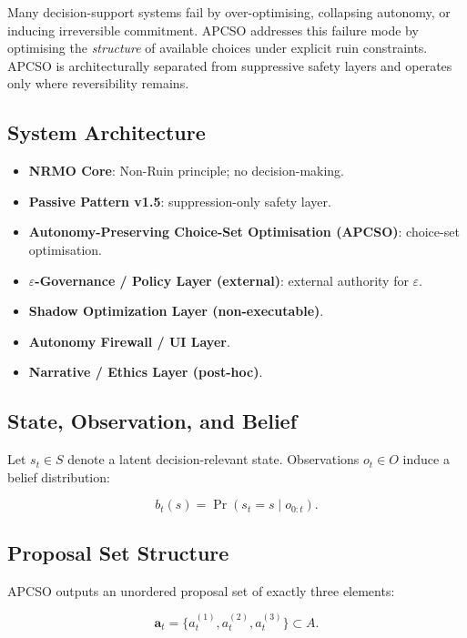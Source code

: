 Many decision-support systems fail by over-optimising, collapsing
autonomy, or inducing irreversible commitment. APCSO addresses this
failure mode by optimising the \emph{structure} of available choices
under explicit ruin constraints. APCSO is architecturally separated
from suppressive safety layers and operates only where reversibility
remains.

\subsection{System Architecture}

\begin{itemize}
\item \textbf{NRMO Core}: Non-Ruin principle; no decision-making.
\item \textbf{Passive Pattern v1.5}: suppression-only safety layer.
\item \textbf{Autonomy-Preserving Choice-Set Optimisation (APCSO)}:
choice-set optimisation.
\item \textbf{$\varepsilon$-Governance / Policy Layer (external)}:
external authority for $\varepsilon$.
\item \textbf{Shadow Optimization Layer (non-executable)}.
\item \textbf{Autonomy Firewall / UI Layer}.
\item \textbf{Narrative / Ethics Layer (post-hoc)}.
\end{itemize}

\subsection{State, Observation, and Belief}

Let $s_t \in S$ denote a latent decision-relevant state. Observations
$o_t \in O$ induce a belief distribution:

\begin{equation}
b_t(s) = \Pr(s_t = s \mid o_{0:t}).
\label{eq:apcso-belief}
\end{equation}

\subsection{Proposal Set Structure}

APCSO outputs an unordered proposal set of exactly three elements:

\begin{equation}
\mathbf{a}_t = \{a_t^{(1)}, a_t^{(2)}, a_t^{(3)}\} \subset A.
\label{eq:apcso-proposal-set}
\end{equation}

